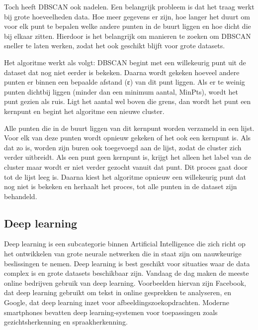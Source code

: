 \vspace{1em}

Toch heeft DBSCAN ook nadelen. Een belangrijk probleem is dat het traag werkt bij grote hoeveelheden data. Hoe meer gegevens er zijn, hoe langer het duurt om voor elk punt te bepalen welke andere punten in de buurt liggen en hoe dicht die bij elkaar zitten. Hierdoor is het belangrijk om manieren te zoeken om DBSCAN sneller te laten werken, zodat het ook geschikt blijft voor grote datasets.

\vspace{1em}

Het algoritme werkt als volgt: DBSCAN begint met een willekeurig punt uit de dataset dat nog niet eerder is bekeken. Daarna wordt gekeken hoeveel andere punten er binnen een bepaalde afstand (ε) van dit punt liggen. Als er te weinig punten dichtbij liggen (minder dan een minimum aantal, MinPts), wordt het punt gezien als ruis. Ligt het aantal wel boven die grens, dan wordt het punt een kernpunt en begint het algoritme een nieuwe cluster.

Alle punten die in de buurt liggen van dit kernpunt worden verzameld in een lijst. Voor elk van deze punten wordt opnieuw gekeken of het ook een kernpunt is. Als dat zo is, worden zijn buren ook toegevoegd aan de lijst, zodat de cluster zich verder uitbreidt. Als een punt geen kernpunt is, krijgt het alleen het label van de cluster maar wordt er niet verder gezocht vanuit dat punt. Dit proces gaat door tot de lijst leeg is. Daarna kiest het algoritme opnieuw een willekeurig punt dat nog niet is bekeken en herhaalt het proces, tot alle punten in de dataset zijn behandeld.\autocite{Hanafi2022}

\subsection{Deep learning}

Deep learning is een subcategorie binnen Artificial Intelligence die zich richt op het ontwikkelen van grote neurale netwerken die in staat zijn om nauwkeurige beslissingen te nemen. Deep learning is best geschikt voor situaties waar de data complex is en grote datasets beschikbaar zijn. Vandaag de dag maken de meeste online bedrijven gebruik van deep learning. Voorbeelden hiervan zijn Facebook, dat deep learning gebruikt om tekst in online gesprekken te analyseren, en Google, dat deep learning inzet voor afbeeldingszoekopdrachten. Moderne smartphones bevatten deep learning-systemen voor toepassingen zoals gezichtsherkenning en spraakherkenning. \autocite{Kelleher2019}

